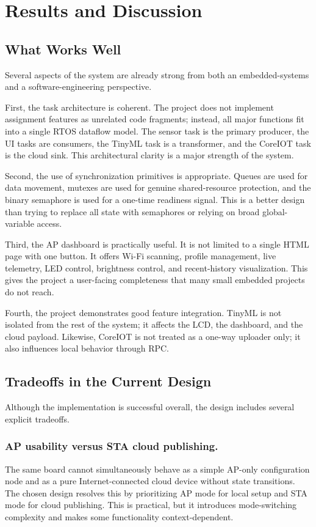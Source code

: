 \section{Results and Discussion}

\subsection{What Works Well}
Several aspects of the system are already strong from both an embedded-systems
and a software-engineering perspective.

First, the task architecture is coherent. The project does not implement
assignment features as unrelated code fragments; instead, all major functions
fit into a single RTOS dataflow model. The sensor task is the primary producer,
the UI tasks are consumers, the TinyML task is a transformer, and the CoreIOT
task is the cloud sink. This architectural clarity is a major strength of the
system.

Second, the use of synchronization primitives is appropriate. Queues are used
for data movement, mutexes are used for genuine shared-resource protection, and
the binary semaphore is used for a one-time readiness signal. This is a better
design than trying to replace all state with semaphores or relying on broad
global-variable access.

Third, the AP dashboard is practically useful. It is not limited to a single
HTML page with one button. It offers Wi-Fi scanning, profile management, live
telemetry, LED control, brightness control, and recent-history visualization.
This gives the project a user-facing completeness that many small embedded
projects do not reach.

Fourth, the project demonstrates good feature integration. TinyML is not
isolated from the rest of the system; it affects the LCD, the dashboard, and
the cloud payload. Likewise, CoreIOT is not treated as a one-way uploader only;
it also influences local behavior through RPC.

\subsection{Tradeoffs in the Current Design}
Although the implementation is successful overall, the design includes several
explicit tradeoffs.

\subsubsection*{AP usability versus STA cloud publishing.}
The same board cannot simultaneously behave as a simple AP-only configuration
node and as a pure Internet-connected cloud device without state transitions.
The chosen design resolves this by prioritizing AP mode for local setup and STA
mode for cloud publishing. This is practical, but it introduces mode-switching
complexity and makes some functionality context-dependent.

